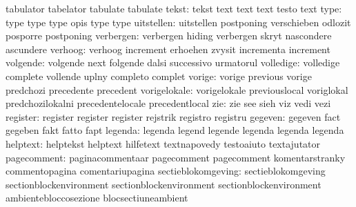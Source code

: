                            tabulator                 tabelator
                           tabulate                  tabulate %
                    tekst: tekst                     text
                           text                      text
                           testo                     text
                     type: type                      type
                           type                      opis
                           type                      type %
               uitstellen: uitstellen                postponing
                           verschieben               odlozit
                           posporre                  postponing %
                verbergen: verbergen                 hiding
                           verbergen                 skryt
                           nascondere                ascundere
                  verhoog: verhoog                   increment
                           erhoehen                  zvysit
                           incrementa                increment
                 volgende: volgende                  next
                           folgende                  dalsi
                           successivo                urmatorul
                volledige: volledige                 complete
                           vollende                  uplny
                           completo                  complet
                   vorige: vorige                    previous
                           vorige                    predchozi
                           precedente                precedent
             vorigelokale: vorigelokale              previouslocal
                           voriglokal                predchozilokalni
                           precedentelocale          precedentlocal
                      zie: zie                       see
                           sieh                      viz
                           vedi                      vezi
                 register: register                  register
                           register                  rejstrik
                           registro                  registru
                  gegeven: gegeven                   fact
                           gegeben                   fakt
                           fatto                     fapt
                  legenda: legenda                   legend
                           legende                   legenda
                           legenda                   legenda
                 helptext: helptekst                 helptext
                           hilfetext                 textnapovedy
                           testoaiuto                textajutator
              pagecomment: paginacommentaar          pagecomment
                           pagecomment               komentarstranky
                           commentopagina            comentariupagina %
       sectieblokomgeving: sectieblokomgeving        sectionblockenvironment
                           sectionblockenvironment   sectionblockenvironment
                           ambientebloccosezione     blocsectiuneambient %


